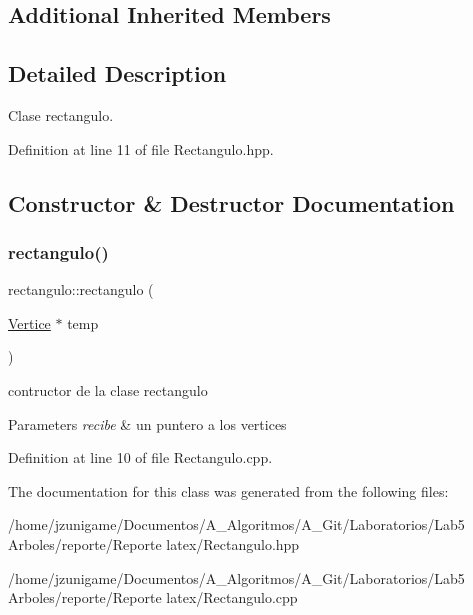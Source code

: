\subsection*{Additional Inherited Members}


\subsection{Detailed Description}
Clase rectangulo. 

Definition at line 11 of file Rectangulo.\+hpp.



\subsection{Constructor \& Destructor Documentation}
\mbox{\label{classrectangulo_aa785cc2d5bd4cbae7dab1912afba62a7}} 
\subsubsection{\texorpdfstring{rectangulo()}{rectangulo()}}
{\footnotesize\ttfamily rectangulo\+::rectangulo (\begin{DoxyParamCaption}\item[{\hyperlink{class_vertice}{Vertice} $\ast$}]{temp }\end{DoxyParamCaption})}



contructor de la clase rectangulo 


\begin{DoxyParams}{Parameters}
{\em recibe} & un puntero a los vertices \\
\hline
\end{DoxyParams}


Definition at line 10 of file Rectangulo.\+cpp.



The documentation for this class was generated from the following files\+:\begin{DoxyCompactItemize}
\item 
/home/jzunigame/\+Documentos/\+A\+\_\+\+Algoritmos/\+A\+\_\+\+Git/\+Laboratorios/\+Lab5 Arboles/reporte/\+Reporte latex/Rectangulo.\+hpp\item 
/home/jzunigame/\+Documentos/\+A\+\_\+\+Algoritmos/\+A\+\_\+\+Git/\+Laboratorios/\+Lab5 Arboles/reporte/\+Reporte latex/Rectangulo.\+cpp\end{DoxyCompactItemize}
